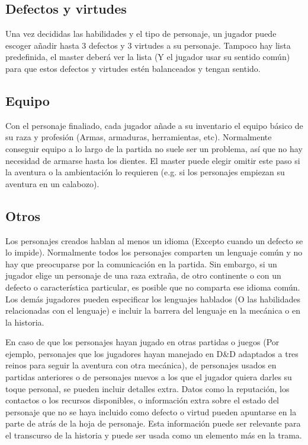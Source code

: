 \subsection{Defectos y virtudes}

Una vez decididas las habilidades y el tipo de personaje, un jugador puede escoger añadir hasta 3 defectos y 3 virtudes a su personaje. Tampoco hay lista predefinida, el master deberá ver la lista (Y el jugador usar su sentido común) para que estos defectos y virtudes estén balanceados y tengan sentido.

\subsection{Equipo}

Con el personaje finaliado, cada jugador añade a su inventario el equipo básico de su raza y profesión (Armas, armaduras, herramientas, etc). Normalmente conseguir equipo a lo largo de la partida no suele ser un problema, así que no hay necesidad de armarse hasta los dientes. El master puede elegir omitir este paso si la aventura o la ambientación lo requieren (e.g. si los personajes empiezan su aventura en un calabozo).

\subsection{Otros}

Los personajes creados hablan al menos un idioma (Excepto cuando un defecto se lo impide). Normalmente todos los personajes comparten un lenguaje común y no hay que preocuparse por la comunicación en la partida. Sin embargo, si un jugador elige un personaje de una raza extraña, de otro continente o con un defecto o característica particular, es posible que no comparta ese idioma común. Los demás jugadores pueden especificar los lenguajes hablados (O las habilidades relacionadas con el lenguaje) e incluir la barrera del lenguaje en la mecánica o en la historia.
\par 
En caso de que los personajes hayan jugado en otras partidas o juegos (Por ejemplo, personajes que los jugadores hayan manejado en D\&D adaptados a tres reinos para seguir la aventura con otra mecánica), de personajes usados en partidas anteriores o de personajes nuevos a los que el jugador quiera darles su toque personal, se pueden incluir detalles extra. Datos como la reputación, los contactos o los recursos disponibles, o información extra sobre el estado del personaje que no se haya incluido como defecto o virtud pueden apuntarse en la parte de atrás de la hoja de personaje. Esta información puede ser relevante para el transcurso de la historia y puede ser usada como un elemento más en la trama.

